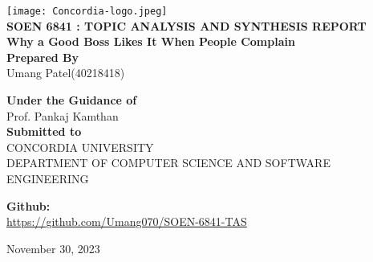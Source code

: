 \documentclass[a4paper,12pt]{article}
\begin{document}
\begin{titlepage}
   \begin{center}
        \vspace*{-8ex}
        \begin{figure}[h!]
  \centering
\end{figure}
          \texttt{[image: Concordia-logo.jpeg]} \\[0.2in]
       \textbf{\large SOEN 6841 : TOPIC ANALYSIS AND SYNTHESIS REPORT}\\[0.3in]
        \textbf{\large Why a Good Boss Likes It When People Complain} \\ [0.3in]
    
        \textbf{\large  Prepared By}\\[0.15in]
         {\centering Umang Patel(40218418)\\[0.4in]}

        \textbf{\large Under the Guidance of}\\[0.15in]
        {\centering Prof. Pankaj Kamthan\\[0.4in]}
        \textbf{\large Submitted to}\\[0.15in]
        {\centering CONCORDIA UNIVERSITY\\[0.1in]} 
        {\centering DEPARTMENT OF COMPUTER SCIENCE AND SOFTWARE ENGINEERING\\[0.2in]}
      

       \vspace{1.0cm}
      
        \textbf{Github:}\\\url{https://github.com/Umang070/SOEN-6841-TAS}\\[0.5in]
        {\centering  \large November 30, 2023 \par}
       \vfill
   \end{center}
\end{titlepage}

\renewcommand{\thesection}{\arabic{section}}
\tableofcontents

\newpage
\end{document}
